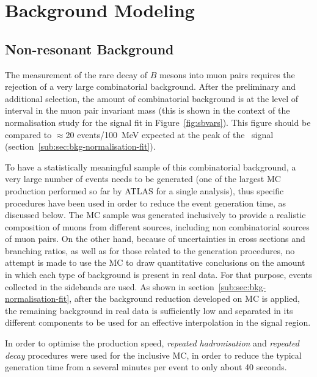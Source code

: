 \usetikzlibrary{decorations.pathmorphing}
\usetikzlibrary{arrows.meta}



\section{Background Modeling}
\label{sec:BackgroundModeling}

\subsection{Non-resonant Background}
\label{sub:sec:continuum}


The measurement of the rare decay of $B$ mesons into muon pairs
requires the rejection of a very large combinatorial background.
After the preliminary and additional selection, the amount of combinatorial
background is at the level of  interval
in the muon pair invariant mass (this is shown in the context of the
normalisation study for the signal fit in Figure~\ref{fig:sbvars}).
This figure should be compared to $\approx$20 events/100~MeV expected
at the peak of the \Bs\ signal (section~\ref{sub:sec:bkg-normalisation-fit}).  

To have a statistically meaningful sample of this combinatorial background,
a very large number of events needs to be generated
(one of the largest MC production performed so far by ATLAS for a single analysis), 
thus specific procedures have been used in order to reduce the event generation
time, as discussed below.  
The MC sample was generated inclusively to provide a realistic composition of muons
from different sources, including non combinatorial sources of muon pairs. 
On the other hand, because of uncertainties in cross sections and branching ratios, 
as well as for those related to the generation procedures, 
no attempt is made to use the MC to draw quantitative conclusions
on the amount in which each type of background is present in real data.
For that purpose, events collected in the sidebands are used.
As shown in section~\ref{sub:sec:bkg-normalisation-fit}, after the background
reduction developed on MC is applied, the remaining background in real data is
sufficiently low and separated in its different components to be used for an
effective interpolation in the signal region. 

In order to optimise the production speed, {\em repeated hadronisation} and {\em repeated decay}
procedures were used for the inclusive MC, in order to reduce the typical generation time
from a several minutes per event to only about 40 seconds. 

